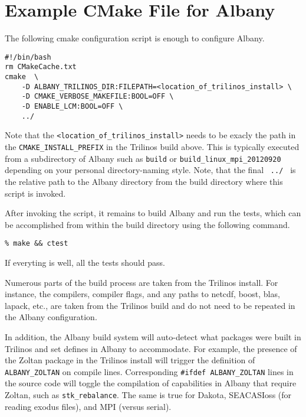 \documentclass[pdf,12pt,report,strict]{SANDreport}
\theoremstyle{remark}
\begin{document}
\section{Example CMake File for Albany}
The following cmake configuration script is enough to configure Albany.
\begin{verbatim}
#!/bin/bash
rm CMakeCache.txt
cmake  \
    -D ALBANY_TRILINOS_DIR:FILEPATH=<location_of_trilinos_install> \
    -D CMAKE_VERBOSE_MAKEFILE:BOOL=OFF \
    -D ENABLE_LCM:BOOL=OFF \
    ../
\end{verbatim}
Note that the \texttt{<location\_of\_trilinos\_install>} needs to be
exacly the path in the \texttt{CMAKE\_INSTALL\_PREFIX} in the Trilinos
build above.  This is typically executed from a subdirectory of Albany such as
\texttt{build} or \texttt{build\_linux\_mpi\_20120920} depending on
your personal directory-naming style.
Note, that the final \texttt{   ../  } is the relative path to the Albany
directory from the build directory where this script is invoked.

After invoking the script, it remains to build Albany and run the
tests, which can be accomplished from within the build directory using
the following command.
\begin{verbatim}
% make && ctest
\end{verbatim}
If everyting is well, all the tests should pass. 

Numerous parts of the build process are taken from the Trilinos install.
For instance, the compilers, compiler flags, and any paths to netcdf,
boost, blas, lapack, etc., are taken from the Trilinos build and do not
need to be repeated in the Albany configuration.

In addition, the Albany build system will auto-detect what packages 
were built in Trilinos and set defines in Albany to accommodate.
For example, the presence of the Zoltan package in the Trilinos install
will trigger the definition of \texttt{ALBANY\_ZOLTAN}  on compile lines. 
Corresponding \texttt{\#ifdef ALBANY\_ZOLTAN} lines in the source code
will toggle the compilation of capabilities in Albany that require
Zoltan, such as \texttt{stk\_rebalance}. The same is true for Dakota,
SEACASIoss (for reading exodus files), and MPI (versus serial).
\end{document}
